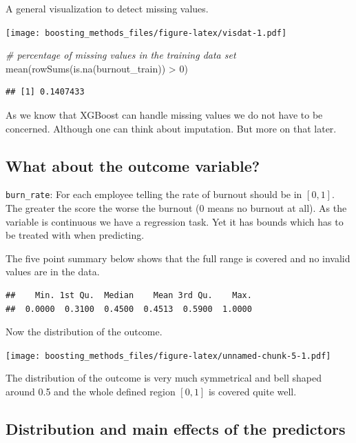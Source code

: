 \documentclass[
]{book}
\newenvironment{Shaded}{\begin{snugshade}}{\end{snugshade}}
\newcommand{\CommentTok}[1]{\textcolor[rgb]{0.56,0.35,0.01}{\textit{#1}}}
\newcommand{\DecValTok}[1]{\textcolor[rgb]{0.00,0.00,0.81}{#1}}
\newcommand{\FunctionTok}[1]{\textcolor[rgb]{0.00,0.00,0.00}{#1}}
\newcommand{\NormalTok}[1]{#1}
\newcommand{\SpecialCharTok}[1]{\textcolor[rgb]{0.00,0.00,0.00}{#1}}
\begin{document}
A general visualization to detect missing values.

\texttt{[image: boosting\_methods\_files/figure-latex/visdat-1.pdf]}

\begin{Shaded}
\begin{Highlighting}[]
\CommentTok{\# percentage of missing values in the training data set}
\FunctionTok{mean}\NormalTok{(}\FunctionTok{rowSums}\NormalTok{(}\FunctionTok{is.na}\NormalTok{(burnout\_train)) }\SpecialCharTok{\textgreater{}} \DecValTok{0}\NormalTok{)}
\end{Highlighting}
\end{Shaded}

\begin{verbatim}
## [1] 0.1407433
\end{verbatim}

As we know that XGBoost can handle missing values we do not have to be concerned. Although one can think about imputation. But more on that later.

\hypertarget{what-about-the-outcome-variable}{%
\subsection{What about the outcome variable?}\label{what-about-the-outcome-variable}}

\texttt{burn\_rate}: For each employee telling the rate of burnout should be in \([0,1]\). The greater the score the worse the burnout (0 means no burnout at all). As the variable is continuous we have a regression task. Yet it has bounds which has to be treated with when predicting.

The five point summary below shows that the full range is covered and no invalid values are in the data.

\begin{verbatim}
##    Min. 1st Qu.  Median    Mean 3rd Qu.    Max. 
##  0.0000  0.3100  0.4500  0.4513  0.5900  1.0000
\end{verbatim}

Now the distribution of the outcome.

\texttt{[image: boosting\_methods\_files/figure-latex/unnamed-chunk-5-1.pdf]}

The distribution of the outcome is very much symmetrical and bell shaped around 0.5 and the whole defined region \([0,1]\) is covered quite well.

\hypertarget{distribution-and-main-effects-of-the-predictors}{%
\subsection{Distribution and main effects of the predictors}\label{distribution-and-main-effects-of-the-predictors}}
\end{document}
